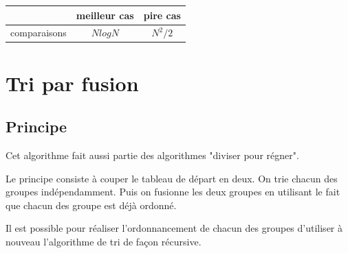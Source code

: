 \begin{center}
\begin{tabular}{|c|c|c|}
\hline 
\rule[-1ex]{0pt}{2.5ex}  & meilleur cas & pire cas \\ 
\hline 
\rule[-1ex]{0pt}{2.5ex} comparaisons & $N log N$  & $N^2/2$ \\ 
\hline 
\end{tabular} 
\end{center}



\section{Tri par fusion}

\subsection{Principe}


Cet algorithme fait aussi partie des algorithmes "diviser pour régner".

Le principe consiste à couper le tableau de départ en deux. On trie chacun des groupes indépendamment. Puis on fusionne les deux groupes en utilisant le fait que chacun des groupe est déjà ordonné.

Il est possible pour réaliser l'ordonnancement de chacun des groupes d'utiliser à nouveau l'algorithme de tri de façon récursive.


